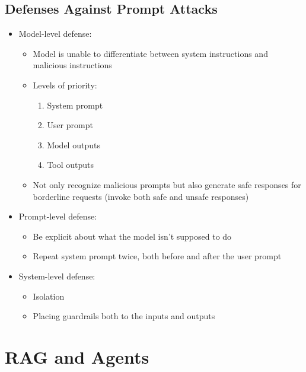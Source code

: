 \documentclass[11pt]{scrartcl}
\begin{document}
\subsection*{Defenses Against Prompt Attacks}
\begin{itemize}
	\item Model-level defense: 
	\begin{itemize}
		\item Model is unable to differentiate between system instructions and malicious instructions
		\item Levels of priority:
		\begin{enumerate}
			\item System prompt
			\item User prompt
			\item Model outputs
			\item Tool outputs
		\end{enumerate}
		\item Not only recognize malicious prompts but also generate safe responses for borderline requests (invoke both safe and unsafe responses)
	\end{itemize}
	\item Prompt-level defense:
	\begin{itemize}
		\item Be explicit about what the model isn't supposed to do
		\item Repeat system prompt twice, both before and after the user prompt
	\end{itemize}
	\item System-level defense:
	\begin{itemize}
		\item Isolation
		\item Placing guardrails both to the inputs and outputs
	\end{itemize}
\end{itemize}


\section*{RAG and Agents}
\end{document}
